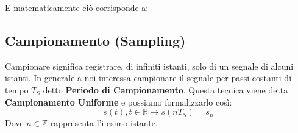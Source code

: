 E matematicamente ciò corrisponde a:
\begin{center}
\end{center}

\subsection{Campionamento (Sampling)}
Campionare significa registrare, di infiniti istanti, solo di un segnale di alcuni istanti. In generale a noi
interessa campionare il segnale per passi costanti di tempo $T_S$ detto \textbf{Periodo di Campionamento}. Questa
tecnica viene detta \textbf{Campionamento Uniforme} e possiamo formalizzarlo così:
\begin{equation*}
    s(t), t \in \mathbb{R} \longrightarrow s(nT_S) = s_n
\end{equation*}
Dove $n \in \mathbb{Z}$ rappresenta l'i-esimo istante.


